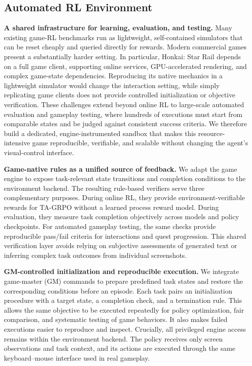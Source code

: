 \subsection{Automated RL Environment}
\label{sec:rl_environment}

\textbf{A shared infrastructure for learning, evaluation, and testing.}
Many existing game-RL benchmarks run as lightweight, self-contained simulators that can be reset cheaply and queried directly for rewards. Modern commercial games present a substantially harder setting. In particular, Honkai: Star Rail depends on a full game client, supporting online services, GPU-accelerated rendering, and complex game-state dependencies. Reproducing its native mechanics in a lightweight simulator would change the interaction setting, while simply replicating game clients does not provide controlled initialization or objective verification. These challenges extend beyond online RL to large-scale automated evaluation and gameplay testing, where hundreds of executions must start from comparable states and be judged against consistent success criteria. We therefore build a dedicated, engine-instrumented sandbox that makes this resource-intensive game reproducible, verifiable, and scalable without changing the agent's visual-control interface.

\textbf{Game-native rules as a unified source of feedback.}
We adapt the game engine to expose task-relevant state transitions and completion conditions to the environment backend. The resulting rule-based verifiers serve three complementary purposes. During online RL, they provide environment-verifiable rewards for TA-GRPO without a learned process reward model. During evaluation, they measure task completion objectively across models and policy checkpoints. For automated gameplay testing, the same checks provide reproducible pass/fail criteria for interactions and quest progression. This shared verification layer avoids relying on subjective assessments of generated text or inferring complex task outcomes from individual screenshots.

\textbf{GM-controlled initialization and reproducible execution.}
We integrate game-master (GM) commands to prepare predefined task states and restore the corresponding conditions before an episode. Each task pairs an initialization procedure with a target state, a completion check, and a termination rule. This allows the same objective to be executed repeatedly for policy optimization, fair comparison, and systematic testing of game behaviors. It also makes failed executions easier to reproduce and inspect. Crucially, all privileged engine access remains within the environment backend. The policy receives only screen observations and task context, and its actions are executed through the same keyboard--mouse interface used in real gameplay.

